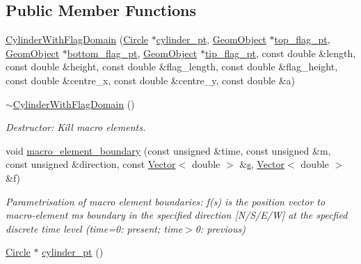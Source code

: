 \subsection*{Public Member Functions}
\begin{DoxyCompactItemize}
\item 
\hyperlink{classoomph_1_1CylinderWithFlagDomain_aa393d14243edaf8b8eaa02c9a01bd869}{Cylinder\+With\+Flag\+Domain} (\hyperlink{classoomph_1_1Circle}{Circle} $\ast$\hyperlink{classoomph_1_1CylinderWithFlagDomain_a783f430b790953da4e01720be56d1872}{cylinder\+\_\+pt}, \hyperlink{classoomph_1_1GeomObject}{Geom\+Object} $\ast$\hyperlink{classoomph_1_1CylinderWithFlagDomain_a268642db566b31b686ba8185e8610d8a}{top\+\_\+flag\+\_\+pt}, \hyperlink{classoomph_1_1GeomObject}{Geom\+Object} $\ast$\hyperlink{classoomph_1_1CylinderWithFlagDomain_a4da493b4e9ddc3fc62f6beb269781e81}{bottom\+\_\+flag\+\_\+pt}, \hyperlink{classoomph_1_1GeomObject}{Geom\+Object} $\ast$\hyperlink{classoomph_1_1CylinderWithFlagDomain_a9977cf9b4b71f83ba0f4d253164d4e00}{tip\+\_\+flag\+\_\+pt}, const double \&length, const double \&height, const double \&flag\+\_\+length, const double \&flag\+\_\+height, const double \&centre\+\_\+x, const double \&centre\+\_\+y, const double \&a)
\item 
\hyperlink{classoomph_1_1CylinderWithFlagDomain_a726928362d0d681f0420d1f088776e80}{$\sim$\+Cylinder\+With\+Flag\+Domain} ()
\begin{DoxyCompactList}\small\item\em Destructor\+: Kill macro elements. \end{DoxyCompactList}\item 
void \hyperlink{classoomph_1_1CylinderWithFlagDomain_a40bca9a30f1f874c043e68621b28de74}{macro\+\_\+element\+\_\+boundary} (const unsigned \&time, const unsigned \&m, const unsigned \&direction, const \hyperlink{classoomph_1_1Vector}{Vector}$<$ double $>$ \&\hyperlink{cfortran_8h_ab7123126e4885ef647dd9c6e3807a21c}{s}, \hyperlink{classoomph_1_1Vector}{Vector}$<$ double $>$ \&f)
\begin{DoxyCompactList}\small\item\em Parametrisation of macro element boundaries\+: f(s) is the position vector to macro-\/element m\textquotesingle{}s boundary in the specified direction \mbox{[}N/\+S/\+E/W\mbox{]} at the specfied discrete time level (time=0\+: present; time$>$0\+: previous) \end{DoxyCompactList}\item 
\hyperlink{classoomph_1_1Circle}{Circle} $\ast$ \hyperlink{classoomph_1_1CylinderWithFlagDomain_a783f430b790953da4e01720be56d1872}{cylinder\+\_\+pt} ()

\end{DoxyCompactItemize}
